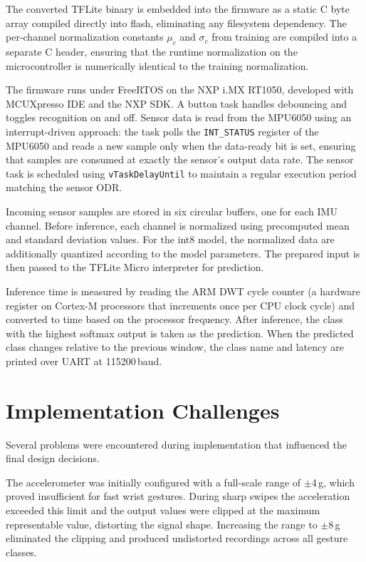 The converted TFLite binary is embedded into the firmware as a static C byte array compiled directly into flash, eliminating any filesystem dependency. The per-channel normalization constants $\mu_c$ and $\sigma_c$ from training are compiled into a separate C header, ensuring that the runtime normalization on the microcontroller is numerically identical to the training normalization.
 
The firmware runs under FreeRTOS on the NXP i.MX RT1050, developed with MCUXpresso IDE and the NXP SDK. A button task handles debouncing and toggles recognition on and off. Sensor data is read from the MPU6050 using an interrupt-driven approach: the task polls the \texttt{INT\_STATUS} register of the MPU6050 and reads a new sample only when the data-ready bit is set, ensuring that samples are consumed at exactly the sensor's output data rate. The sensor task is scheduled using \texttt{vTaskDelayUntil} to maintain a regular execution period matching the sensor ODR.

Incoming sensor samples are stored in six circular buffers, one for each IMU channel. Before inference, each channel is normalized using precomputed mean and standard deviation values. For the int8 model, the normalized data are additionally quantized according to the model parameters. The prepared input is then passed to the TFLite Micro interpreter for prediction.

Inference time is measured by reading the ARM DWT cycle counter (a hardware register on Cortex-M processors that increments once per CPU clock cycle) and converted to time based on the processor frequency. After inference, the class with the highest softmax output is taken as the prediction. When the predicted class changes relative to the previous window, the class name and latency are printed over UART at 115200\,baud.

\section{Implementation Challenges}
\label{sec:challenges}
 
Several problems were encountered during implementation that influenced the final design decisions.
 
The accelerometer was initially configured with a full-scale range of $\pm$4\,g, which proved insufficient for fast wrist gestures. During sharp swipes the acceleration exceeded this limit and the output values were clipped at the maximum representable value, distorting the signal shape. Increasing the range to $\pm$8\,g eliminated the clipping and produced undistorted recordings across all gesture classes.
 
